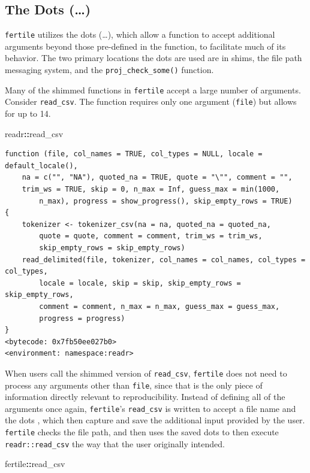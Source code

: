 \documentclass[12pt,twoside]{reedthesis}
\newenvironment{Shaded}{\begin{snugshade}}{\end{snugshade}}
\newcommand{\OperatorTok}[1]{\textcolor[rgb]{0.81,0.36,0.00}{\textbf{#1}}}
\newcommand{\NormalTok}[1]{#1}
\begin{document}
\subsection{The Dots (\ldots{})}\label{the-dots}

\texttt{fertile} utilizes the dots (\ldots{}), which allow a function to
accept additional arguments beyond those pre-defined in the function, to
facilitate much of its behavior. The two primary locations the dots are
used are in shims, the file path messaging system, and the
\texttt{proj\_check\_some()} function.

Many of the shimmed functions in \texttt{fertile} accept a large number
of arguments. Consider \texttt{read\_csv}. The function requires only
one argument (\texttt{file}) but allows for up to 14.
\begin{Shaded}
\begin{Highlighting}[]
\NormalTok{readr}\OperatorTok{::}\NormalTok{read_csv}
\end{Highlighting}
\end{Shaded}
\begin{verbatim}
function (file, col_names = TRUE, col_types = NULL, locale = default_locale(), 
    na = c("", "NA"), quoted_na = TRUE, quote = "\"", comment = "", 
    trim_ws = TRUE, skip = 0, n_max = Inf, guess_max = min(1000, 
        n_max), progress = show_progress(), skip_empty_rows = TRUE) 
{
    tokenizer <- tokenizer_csv(na = na, quoted_na = quoted_na, 
        quote = quote, comment = comment, trim_ws = trim_ws, 
        skip_empty_rows = skip_empty_rows)
    read_delimited(file, tokenizer, col_names = col_names, col_types = col_types, 
        locale = locale, skip = skip, skip_empty_rows = skip_empty_rows, 
        comment = comment, n_max = n_max, guess_max = guess_max, 
        progress = progress)
}
<bytecode: 0x7fb50ee027b0>
<environment: namespace:readr>
\end{verbatim}
When users call the shimmed version of \texttt{read\_csv},
\texttt{fertile} does not need to process any arguments other than
\texttt{file}, since that is the only piece of information directly
relevant to reproducibility. Instead of defining all of the arguments
once again, \texttt{fertile}'s \texttt{read\_csv} is written to accept a
file name and the dots , which then capture and save the additional
input provided by the user. \texttt{fertile} checks the file path, and
then uses the saved dots to then execute \texttt{readr::read\_csv} the
way that the user originally intended.
\begin{Shaded}
\begin{Highlighting}[]
\NormalTok{fertile}\OperatorTok{::}\NormalTok{read_csv}
\end{Highlighting}
\end{Shaded}
\end{document}
